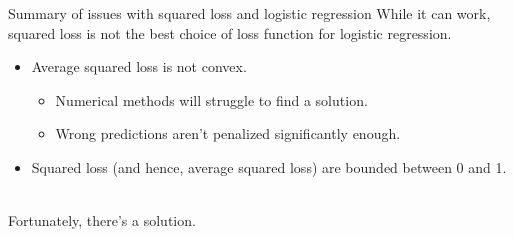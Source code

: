 \documentclass[aspectratio=169]{../latex_main/tntbeamer}  %
\begin{document}
	\begin{frame}{Summary of issues with squared loss and logistic regression}
	    While it can work, squared loss is not the best choice of loss function for logistic regression.
	    \begin{itemize}
	        \item Average squared loss is not convex.
	        \begin{itemize}
	            \item Numerical methods will struggle to find a solution.
	        \end{itemize}
	        \begin{itemize}
	            \item Wrong predictions aren’t penalized significantly enough.
	        \end{itemize}
	        \item Squared loss (and hence, average squared loss) are bounded between 0 and 1.
	    \end{itemize}
	    \\
	    \bigskip
	    Fortunately, there’s a solution.
	\end{frame}
\end{document}
